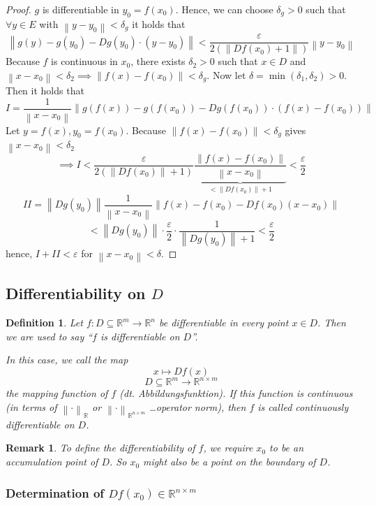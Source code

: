 \documentclass{article}
\newtheorem{definition}{Definition}  \numberwithin{definition}{section}
\newtheorem{remark}{Remark}  \numberwithin{remark}{section}
\newcommand{\norm}[1]{\left\|#1\right\|}
\begin{document}
\begin{proof}
  $g$ is differentiable in $y_0 = f(x_0)$. Hence, we can choose $\delta_g > 0$ such that $\forall y \in E$ with $\norm{y - y_0} < \delta_g$
  it holds that
  \[ \norm{g(y) - g(y_0) - Dg(y_0) \cdot (y - y_0)} < \frac{\varepsilon}{2 \left(\norm{Df(x_0) + 1}\right)} \norm{y - y_0} \]
  Because $f$ is continuous in $x_0$, there exists $\delta_2 > 0$ such that $x \in D$ and $\norm{x - x_0} < \delta_2 \implies \norm{f(x) - f(x_0)} < \delta_g$.
  Now let $\delta = \min(\delta_1, \delta_2) > 0$. Then it holds that
  \[ I = \frac{1}{\norm{x - x_0}} \norm{g(f(x)) - g(f(x_0)) - Dg(f(x_0)) \cdot (f(x) - f(x_0))} \]
  Let $y = f(x), y_0 = f(x_0)$.
  Because $\norm{f(x) - f(x_0)} < \delta_g$ gives $\norm{x - x_0} < \delta_2$
  \[ \implies I < \frac{\varepsilon}{2 \left(\norm{Df(x_0)} + 1\right)} \underbrace{\frac{\norm{f(x) - f(x_0)}}{\norm{x - x_0}}}_{< \norm{Df(x_0)} + 1} < \frac\varepsilon2 \]
  \[ II = \norm{Dg(y_0)} \frac{1}{\norm{x - x_0}} \norm{f(x) - f(x_0) - Df(x_0) (x - x_0)} \]
  \[ < \norm{Dg(y_0)} \cdot \frac{\varepsilon}{2} \cdot \frac{1}{\norm{Dg(y_0)} + 1} < \frac\varepsilon2 \]
  hence, $I + II < \varepsilon$ for $\norm{x - x_0} < \delta$.
\end{proof}

\subsection{Differentiability on $D$}
\begin{definition}
  Let $f: D \subseteq \mathbb R^m \to \mathbb R^n$ be differentiable in every point $x \in D$.
  Then we are used to say \enquote{$f$ is differentiable \emph{on} $D$}.

  In this case, we call the map
  \[ x \mapsto Df(x) \]
  \[ D \subseteq \mathbb R^m \to \mathbb R^{n \times m} \]
  the mapping function of $f$ (dt. \foreignlanguage{german}{Abbildungsfunktion}).
  If this function is continuous (in terms of $\norm{\cdot}_{\mathbb R}$ or $\norm{\cdot}_{\mathbb R^{n \times m}}$ \dots operator norm),
  then $f$ is called continuously differentiable on $D$.
\end{definition}

\begin{remark}
  To define the differentiability of $f$, we require $x_0$ to be an accumulation point of $D$.
  So $x_0$ might also be a point on the boundary of $D$.
\end{remark}

\subsubsection{Determination of $Df(x_0) \in \mathbb R^{n \times m}$}
\end{document}
